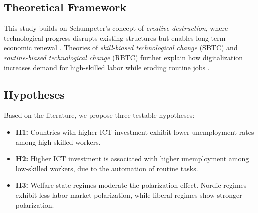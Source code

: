 \subsection{Theoretical Framework}

This study builds on Schumpeter’s concept of \textit{creative destruction}, where technological 
progress disrupts existing structures but enables long-term economic renewal 
\parencite{schumpeter1976capitalism}. Theories of \textit{skill-biased technological change} 
(SBTC) and \textit{routine-biased technological change} (RBTC) further explain how digitalization 
increases demand for high-skilled labor while eroding routine jobs 
\parencite{violante2008skill, goos2014explaining}.

\subsection{Hypotheses}

Based on the literature, we propose three testable hypotheses:

\begin{itemize}
    \item \textbf{H1:} Countries with higher ICT investment exhibit lower unemployment rates 
    among high-skilled workers.
    \item \textbf{H2:} Higher ICT investment is associated with higher unemployment among 
    low-skilled workers, due to the automation of routine tasks.
    \item \textbf{H3:} Welfare state regimes moderate the polarization effect. Nordic regimes 
    exhibit less labor market polarization, while liberal regimes show stronger polarization.
\end{itemize}
